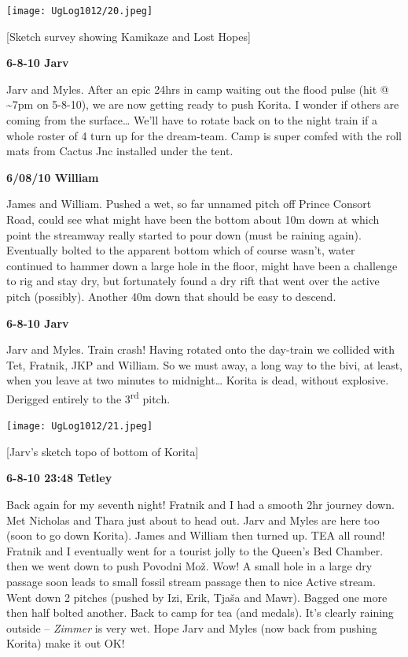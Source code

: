 \texttt{[image: UgLog1012/20.jpeg]}

{[}Sketch survey showing Kamikaze and Lost Hopes{]}

\textbf{6-8-10 Jarv}

Jarv and Myles. After an epic 24hrs in camp waiting out the flood pulse
(hit @ \textasciitilde{}7pm on 5-8-10), we are now getting ready to push
Korita. I wonder if others are coming from the surface\ldots{} We'll
have to rotate back on to the night train if a whole roster of 4 turn up
for the dream-team. Camp is super comfed with the roll mats from Cactus
Jnc installed under the tent.

\textbf{6/08/10 William}

James and William. Pushed a wet, so far unnamed pitch off Prince Consort
Road, could see what might have been the bottom about 10m down at which
point the streamway really started to pour down (must be raining again).
Eventually bolted to the apparent bottom which of course wasn't, water
continued to hammer down a large hole in the floor, might have been a
challenge to rig and stay dry, but fortunately found a dry rift that
went over the active pitch (possibly). Another 40m down that should be
easy to descend.

\textbf{6-8-10 Jarv}

Jarv and Myles. Train crash! Having rotated onto the day-train we
collided with Tet, Fratnik, JKP and William. So we must away, a long way
to the bivi, at least, when you leave at two minutes to midnight\ldots{}
Korita is dead, without explosive. Derigged entirely to the
3\textsuperscript{rd} pitch.

\texttt{[image: UgLog1012/21.jpeg]}

{[}Jarv's sketch topo of bottom of Korita{]}

\textbf{6-8-10 23:48 Tetley}

Back again for my seventh night! Fratnik and I had a smooth 2hr journey
down. Met Nicholas and Thara just about to head out. Jarv and Myles are
here too (soon to go down Korita). James and William then turned up. TEA
all round! Fratnik and I eventually went for a tourist jolly to the
Queen's Bed Chamber. then we went down to push Povodni Mož. Wow! A small
hole in a large dry passage soon leads to small fossil stream passage
then to nice Active stream. Went down 2 pitches (pushed by Izi, Erik,
Tjaša and Mawr). Bagged one more then half bolted another. Back to camp
for tea (and medals). It's clearly raining outside -- \emph{Zimmer} is
very wet. Hope Jarv and Myles (now back from pushing Korita) make it out
OK!

